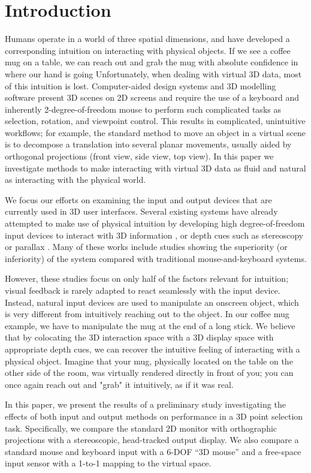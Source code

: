 \section{Introduction}\label{sec:intro}
Humans operate in a world of three spatial dimensions, and have developed a
corresponding intuition on interacting with physical objects.
If we see a coffee mug on a table, we can reach out and grab the mug with
absolute confidence in where our hand is going
Unfortunately, when dealing with virtual 3D data, most of this intuition is
lost. Computer-aided design systems and 3D modelling software present 3D scenes
on 2D screens and require the use of a keyboard and inherently
2-degree-of-freedom mouse to perform such complicated tasks as selection,
rotation, and viewpoint control. This results in complicated, unintuitive
workflows; for example, the standard method to move an object in a virtual scene
is to decompose a translation into several planar movements, usually aided by
orthogonal projections (front view, side view, top view). In this paper we
investigate methods to make interacting with virtual 3D data as fluid and
natural as interacting with the physical world.

We focus our efforts on examining the input and output devices that are
currently used in 3D user interfaces. Several existing systems have already
attempted to make use of physical intuition by developing high degree-of-freedom
input devices to interact with 3D information \cite{manders2010gesture,
mattheiss2011navigating,mine1997moving}, or depth cues such as
stereoscopy or parallax \cite{boritz1997study, schultheis2012comparison}.
Many of these works include studies showing the superiority (or inferiority)
of the system compared with traditional mouse-and-keyboard systems.

However, these studies focus on only half of the factors relevant for intuition;
visual feedback is rarely adapted to react seamlessly with the input device.
Instead, natural input devices are used to manipulate an onscreen object, which
is very different from intuitively reaching out to the object. In our coffee
mug example, we have to manipulate the mug at the end of a long stick. We
believe that by colocating the 3D interaction space with a 3D display space
with appropriate depth cues, we can recover the intuitive feeling of interacting
with a physical object. Imagine that your mug, physically located on the table
on the other side of the room, was virtually rendered directly in front of you;
you can once again reach out and "grab" it intuitively, as if it was real.

In this paper, we present the results of a preliminary study investigating the
effects of both input and output methods on performance in a 3D point selection
task. Specifically, we compare the standard 2D monitor with orthographic
projections with a stereoscopic, head-tracked output display. We also compare a
standard mouse and keyboard input with a 6-DOF ``3D mouse'' and a free-space
input sensor with a 1-to-1 mapping to the virtual space.
